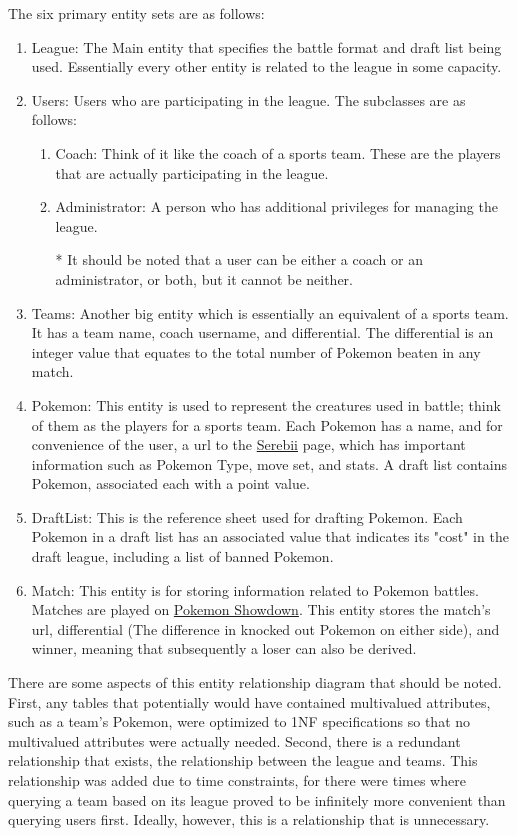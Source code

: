 \documentclass{article}
\begin{document}
The six primary entity sets are as follows:
\begin{enumerate}
    \item League: The Main entity that specifies the battle format and draft list being used. Essentially every other entity is related to the league in some capacity.
    \item Users: Users who are participating in the league. The subclasses are as follows: \begin{enumerate}
        \item Coach: Think of it like the coach of a sports team. These are the players that are actually participating in the league.
        \item Administrator: A person who has additional privileges for managing the league.
        \item[*] It should be noted that a user can be either a coach or an administrator, or both, but it cannot be neither.
    \end{enumerate}
    \item Teams: Another big entity which is essentially an equivalent of a sports team. It has a team name, coach username, and differential. 
    The differential is an integer value that equates to the total number of Pokemon beaten in any match.
    \item Pokemon: This entity is used to represent the creatures used in battle; think of them as the players for a sports team. 
    Each Pokemon has a name, and for convenience of the user, a url to the \href{https://www.serebii.net/}{Serebii} page, which has important information such as Pokemon Type, move set, and stats. 
    A draft list contains Pokemon, associated each with a point value.
    \item DraftList: This is the reference sheet used for drafting Pokemon. Each Pokemon in a draft list has an associated value that indicates its "cost" in the draft league, including a list of banned Pokemon.
    \item Match: This entity is for storing information related to Pokemon battles. Matches are played on \href{https://pokemonshowdown.com/}{Pokemon Showdown}. 
    This entity stores the match's url, differential (The difference in knocked out Pokemon on either side), and winner, meaning that  subsequently a loser can also be derived.
\end{enumerate}
There are some aspects of this entity relationship diagram that should be noted. 
First, any tables that potentially would have contained multivalued attributes, such as a team's Pokemon, were optimized to 1NF specifications so that no multivalued attributes were actually needed. 
Second, there is a redundant relationship that exists, the relationship between the league and teams. 
This relationship was added due to time constraints, for there were times where querying a team based on its league proved to be infinitely more convenient than querying users first. Ideally, however, this is a relationship that is unnecessary.
\end{document}
